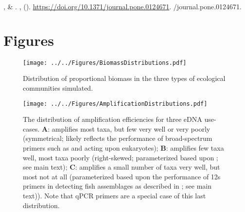 \documentclass[fleqn,11pt,lineno]{wlscirep}
\begin{document}
\begin{thebibliography}{10}
,  \&
\newblock {}.
 \textbf{},
   ().
\newblock \urlprefix\url{https://doi.org/10.1371/journal.pone.0124671}.
\newblock {}/journal.pone.0124671.

\end{thebibliography}



\clearpage

\section*{Figures}


\begin{figure}[!hbt]
\begin{center}
\texttt{[image: ../../Figures/BiomassDistributions.pdf]}
\caption{Distribution of proportional biomass in the three types of ecological communities simulated.}
\end{center}
\end{figure}


\begin{figure}[!hbt]
\begin{center}
  \texttt{[image: ../../Figures/AmplificationDistributions.pdf]}
  \caption{{%
  The distribution of amplification efficiencies for three eDNA use-cases.
     \textbf{A}: amplifies most taxa, but few very well or very poorly (symmetrical; likely reflects the performance of broad-spectrum primers such as \cite{leray_new_2013} and \cite{stoeck_multiple_2010} acting upon eukaryotes);
   	\textbf{B}: amplifies few taxa well, most taxa poorly (right-skewed; parameterized based upon \cite{deiner2016environmental}; see main text);   
	\textbf{C}: amplifies a small number of taxa very well, but most not at all (parameterized based upon the performance of 12s primers \cite{riaz_ecoprimers:_2011} in detecting fish assemblages as described in \cite{hanfling2016environmental}; see main text)).  Note that qPCR primers are a special case of this last distribution.}}
\end{center}
\end{figure}
\end{document}

